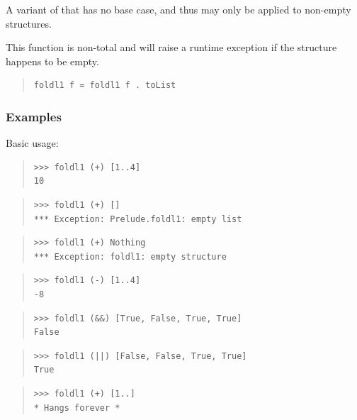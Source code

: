 \begin{haddockdesc}
\item[\begin{tabular}{@{}l}
foldl1 :: Foldable t => (a -> a -> a) -> t a -> a
\end{tabular}]
{\haddockbegindoc
A variant of  that has no base case,
 and thus may only be applied to non-empty structures.\par
This function is non-total and will raise a runtime exception if the
 structure happens to be empty.\par
\begin{quote}
{\haddockverb\begin{verbatim}
foldl1 f = foldl1 f . toList\end{verbatim}}
\end{quote}
\subsubsection*{\textbf{Examples}}
Basic usage:\par
\begin{quote}
{\haddockverb\begin{verbatim}
>>> foldl1 (+) [1..4]
10

\end{verbatim}}
\end{quote}
\begin{quote}
{\haddockverb\begin{verbatim}
>>> foldl1 (+) []
*** Exception: Prelude.foldl1: empty list

\end{verbatim}}
\end{quote}
\begin{quote}
{\haddockverb\begin{verbatim}
>>> foldl1 (+) Nothing
*** Exception: foldl1: empty structure

\end{verbatim}}
\end{quote}
\begin{quote}
{\haddockverb\begin{verbatim}
>>> foldl1 (-) [1..4]
-8

\end{verbatim}}
\end{quote}
\begin{quote}
{\haddockverb\begin{verbatim}
>>> foldl1 (&&) [True, False, True, True]
False

\end{verbatim}}
\end{quote}
\begin{quote}
{\haddockverb\begin{verbatim}
>>> foldl1 (||) [False, False, True, True]
True

\end{verbatim}}
\end{quote}
\begin{quote}
{\haddockverb\begin{verbatim}
>>> foldl1 (+) [1..]
* Hangs forever *

\end{verbatim}}
\end{quote}}
\end{haddockdesc}
